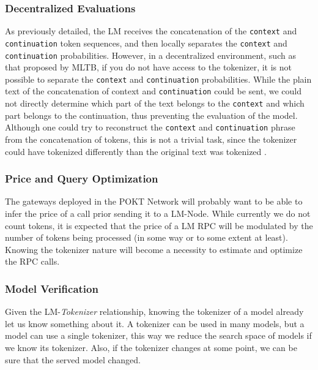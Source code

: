 \subsubsection*{Decentralized Evaluations}

As previously detailed, the \gls{LM} receives the concatenation of the \texttt{context} and \texttt{continuation} token sequences, and then locally separates the \texttt{context} and \texttt{continuation} probabilities. 
However, in a decentralized environment, such as that proposed by \gls{MLTB}, if you do not have access to the tokenizer, it is not possible to separate the \texttt{context} and \texttt{continuation} probabilities. 
While the plain text of the concatenation of context and \texttt{continuation} could be sent, we could not directly determine which part of the text belongs to the \texttt{context} and which part belongs to the continuation, thus preventing the evaluation of the model. 
Although one could try to reconstruct the \texttt{context} and \texttt{continuation} phrase from the concatenation of tokens, this is not a trivial task, since the tokenizer could have tokenized differently than the original text was tokenized \cite{biderman_lessons_2024}. 

\subsubsection*{Price and Query Optimization}

The gateways deployed in the POKT Network will probably want to be able to infer the price of a call prior sending it to a \gls{LM}-Node. While currently we do not count tokens, it is expected that the price of a \gls{LM} \gls{RPC} will be modulated by the number of tokens being processed (in some way or to some extent at least). Knowing the tokenizer nature will become a necessity to estimate and optimize the \gls{RPC} calls.

\subsubsection*{Model Verification}

Given the \gls{LM}-\emph{Tokenizer} relationship, knowing the tokenizer of a model already let us know something about it. A tokenizer can be used in many models, but a model can use a single tokenizer, this way we reduce the search space of models if we know its tokenizer. Also, if the tokenizer changes at some point, we can be sure that the served model changed.

